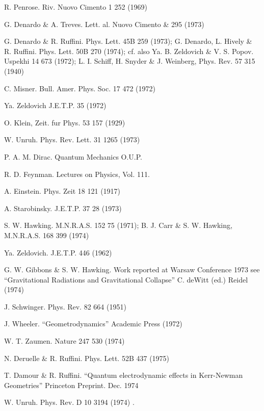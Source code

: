 \begin{thebibliography}{100}

\small
\raggedright

 R. Penrose. Riv. Nuovo Cimento 1 252 (1969)

 G. Denardo \& A. Treves. Lett. al. Nuovo Cimento \& 295 (1973)

 G. Denardo \& R. Ruffini. Phys. Lett. 45B 259 (1973); G. Denardo, L. Hively
\& R. Ruffini. Phys. Lett. 50B 270 (1974); cf. also Ya. B. Zeldovich \&
V. S. Popov. Uspekhi 14 673 (1972); L. I. Schiff, H. Snyder \& J. Weinberg,
Phys. Rev. 57 315 (1940)

 C. Misner. Bull. Amer. Phys. Soc. 17 472 (1972)

\bibitem[5]{} Ya. Zeldovich J.E.T.P. 35 (1972)

\bibitem[6]{} O. Klein, Zeit. fur Phys. 53 157 (1929)

 W. Unruh. Phys. Rev. Lett. 31 1265 (1973)

 P. A. M. Dirac. Quantum Mechanics O.U.P.

\bibitem[9]{} R. D. Feynman. Lectures on Physics, Vol. 111.

\bibitem[10]{} A. Einstein. Phys. Zeit 18 121 (1917)

\bibitem[11]{} A. Starobinsky. J.E.T.P. 37 28 (1973)

\bibitem[12]{} S. W. Hawking.
M.N.R.A.S. 152 75 (1971); B. J. Carr \& S. W. Hawking,
M.N.R.A.S. 168 399 (1974)

 Ya. Zeldovich. J.E.T.P. 446 (1962) 

 G. W. Gibbons \& S. W. Hawking. Work reported at Warsaw Conference 1973
see ``Gravitational Radiations and Gravitational Collapse'' C. deWitt (ed.) Reidel (1974)

\bibitem[15]{} J. Schwinger. Phys. Rev. 82 664 (1951)

\bibitem[16]{} J. Wheeler. ``Geometrodynamics'' Academic Press (1972)

\bibitem[17]{} W. T. Zaumen. Nature 247 530 (1974)

\bibitem[19]{} N. Deruelle \& R. Ruffini. Phys. Lett. 52B 437 (1975)

\bibitem[20]{} T. Damour \& R. Ruffini. ``Quantum electrodynamic effects in Kerr-Newman
Geometries'' Princeton Preprint. Dec. 1974

\bibitem[21]{} W. Unruh. Phys. Rev. D 10 3194 (1974) .


\end{thebibliography}
